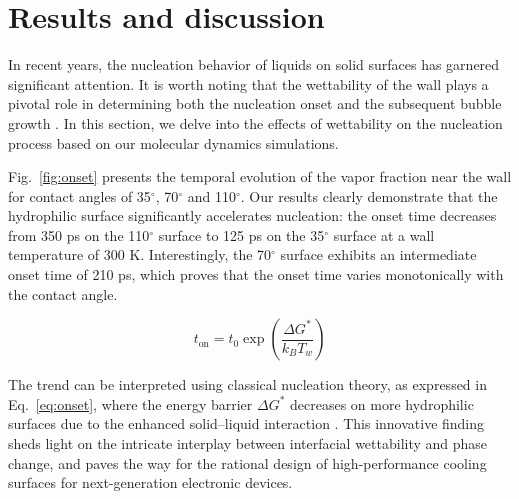 \section{Results and discussion}\label{sec:results}

In recent years, the nucleation behavior of liquids on solid surfaces has garnered significant attention. It is worth noting that the wettability of the wall plays a pivotal role in determining both the nucleation onset and the subsequent bubble growth \cite{kim2015,chen2019}. In this section, we delve into the effects of wettability on the nucleation process based on our molecular dynamics simulations.

Fig.~\ref{fig:onset} presents the temporal evolution of the vapor fraction near the wall for contact angles of 35$^\circ$, 70$^\circ$ and 110$^\circ$. Our results clearly demonstrate that the hydrophilic surface significantly accelerates nucleation: the onset time decreases from 350 ps on the 110$^\circ$ surface to 125 ps on the 35$^\circ$ surface at a wall temperature of 300 K. Interestingly, the 70$^\circ$ surface exhibits an intermediate onset time of 210 ps, which proves that the onset time varies monotonically with the contact angle.

\begin{equation}
  t_{\mathrm{on}} = t_0 \exp\left(\frac{\Delta G^*}{k_B T_w}\right)
  \label{eq:onset}
\end{equation}

The trend can be interpreted using classical nucleation theory, as expressed in Eq.~\eqref{eq:onset}, where the energy barrier $\Delta G^*$ decreases on more hydrophilic surfaces due to the enhanced solid--liquid interaction \cite{carey2018}. This innovative finding sheds light on the intricate interplay between interfacial wettability and phase change, and paves the way for the rational design of high-performance cooling surfaces for next-generation electronic devices.
